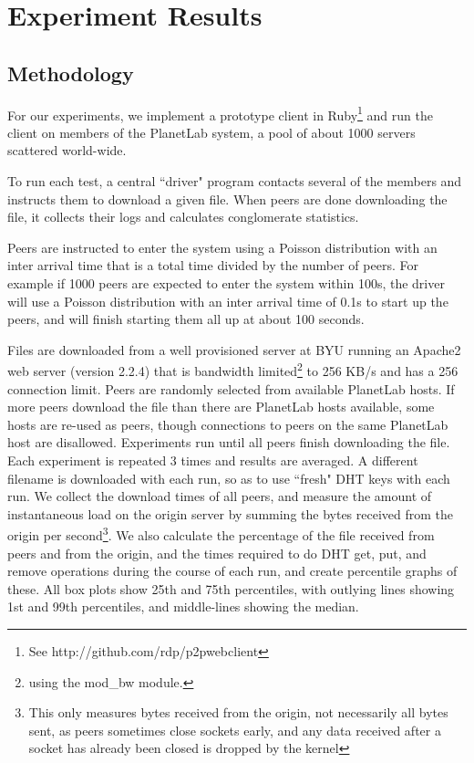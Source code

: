 
\section{Experiment Results}

\subsection {Methodology} 

For our experiments, we implement a prototype client in Ruby\footnote{See http://github.com/rdp/p2pwebclient} and 
run the client on members of the PlanetLab system, a pool of about 1000 servers scattered world-wide.

To run each test, a central ``driver" program contacts several of the members and instructs them to download a given file.
When peers are done downloading the file, it collects their logs and calculates conglomerate statistics.

Peers are instructed to enter the system using a Poisson distribution with an inter 
arrival time that is a total time divided by the number of peers.
For example if 1000 peers are expected to enter the system within 100s, the driver
will use a Poisson distribution with an inter arrival time of 0.1s to start up the peers, and will finish 
starting them all up at about 100 seconds.

Files are downloaded from a well provisioned server at BYU running an Apache2 web server (version 2.2.4) that is
bandwidth limited\footnote{using the mod\_bw module.} to 256 KB/s and has a 256 connection limit. 
Peers are randomly selected from available PlanetLab hosts.  If more peers download the file than
there are PlanetLab hosts available, some hosts are re-used as peers, though connections to peers on the same PlanetLab
host are disallowed.  Experiments run until 
all peers finish downloading the file. Each experiment is repeated 3 times and results are averaged. 
A different filename is downloaded with each run, so as to use ``fresh" DHT keys with each run. We collect the download 
times of all peers, and measure the amount of instantaneous load on the origin server by summing the 
bytes received from the origin per second\footnote{This only measures bytes received from the origin, not necessarily all bytes sent, 
as peers sometimes close sockets early, and any data received after a socket has already been closed is dropped by the kernel}.
We also calculate the percentage of the file received from peers and from the origin, and the times required to do DHT 
get, put, and remove operations during the course of each run, and create percentile graphs of these.  
All box plots show 25th and 75th percentiles, with outlying lines showing 1st and 99th percentiles, and middle-lines showing the median.

